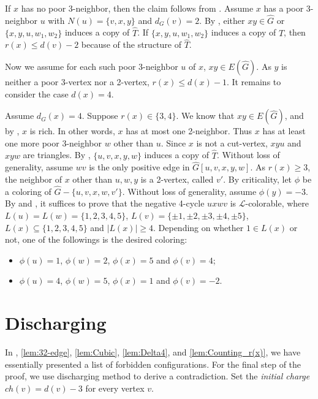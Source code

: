 \documentclass[11pt,a4paper]{article}
\makeatletter
\renewenvironment{proof}[1][\proofname]{\par
	\pushQED{\qed}%
	\normalfont \topsep6\p@\@plus6\p@\relax
	\trivlist
	\item[\hskip\labelsep
	\bfseries
	#1\@addpunct{.}]\ignorespaces
}{%
	\popQED\endtrivlist\@endpefalse
}
\theoremstyle{definition}
\makeatother
\begin{document}
\begin{proof}
	If $x$ has no poor 3-neighbor, then the claim follows from . Assume $x$ has a poor 3-neighbor $u$ with $N(u)=\{v, x, y\}$ and $d_G(v)=2$. By , either $xy\in \widehat{G}$ or $\{x,y,u,w_1,w_2\}$ induces a copy of $\widehat{T}$. If $\{x,y,u,w_1,w_2\}$ induces a copy of $\widehat{T}$, then $r(x)\leq d(v)-2$ because of the structure of $\widehat{T}$. 
	
	Now we assume for each such poor 3-neighbor $u$ of $x$, $xy\in E(\widehat{G})$. As $y$ is neither a poor 3-vertex nor a 2-vertex, $r(x)\leq d(x)-1$. It remains to consider the case $d(x)=4$.
	
	
	Assume $d_G(x)=4$. Suppose $r(x)\in \{3, 4\}$.  We know that $xy\in E(\widehat{G})$, and by , $x$ is rich. In other words, $x$ has at most one 2-neighbor. Thus $x$ has at least one more poor 3-neighbor $w$ other than $u$. Since $x$ is not a cut-vertex, $xyu$ and $xyw$ are triangles. By , $\{u,v,x,y,w\}$ induces a copy of $\widehat{T}$. Without loss of generality, assume $wv$ is the only positive edge in $\widehat{G}[u,v,x,y,w]$. As $r(x)\ge 3$, the neighbor of $x$ other than $u,w,y$ is a 2-vertex, called $v'$. By criticality, let $\phi$ be a coloring of $\widehat{G}-\{u,v,x,w,v'\}$.  Without loss of generality, assume $\phi(y)=-3$. By   and , it suffices to prove that the negative 4-cycle $uxwv$  is $\mathcal{L}$-colorable, where $L(u)=L(w)=\{1,2,3,4,5\}$, $L(v)=\{ \pm 1,\pm2, \pm 3, \pm4, \pm5\}$, $L(x)\subseteq \{1,2,3,4,5\}$  and $|L(x)|\ge 4$. 
	Depending on whether $1\in L(x)$ or not, one of the followings is the desired coloring:
	\begin{itemize}
	\item $\phi(u)=1$, $\phi(w)=2$, $\phi(x)=5$ and $\phi(v)=4$;
	\item $\phi(u)=4$, $\phi(w)=5$, $\phi(x)=1$ and $\phi(v)=-2$.\qedhere
	\end{itemize} \end{proof}


\section{Discharging}
In , \ref{lem:32-edge}, \ref{lem:Cubic}, \ref{lem:Delta4}, and  \ref{lem:Counting_r(x)}, we have essentially presented a list of forbidden configurations. For the final step of the proof, we use discharging method to derive a contradiction. 
Set the \emph{initial charge} $ch(v)=d(v)-3$ for every vertex $v$.
\end{document}
